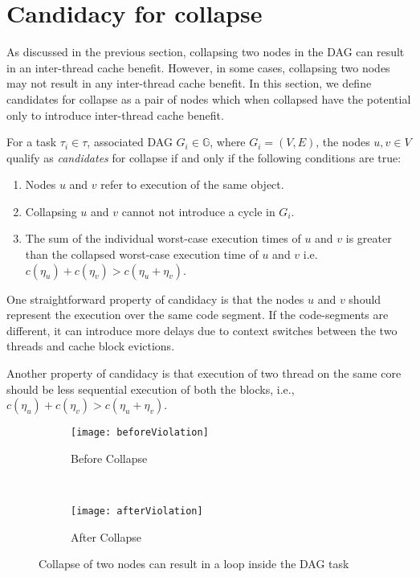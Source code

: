 \section{Candidacy for collapse}
As discussed in the previous section, collapsing two nodes in the DAG can result in an inter-thread cache benefit. However, in some cases, collapsing two nodes may not result in any inter-thread cache benefit. In this section, we define candidates for collapse as a pair of nodes which when collapsed have the potential only to introduce inter-thread cache benefit. 

For a task ${\tau_i \in \tau}$, associated DAG ${G_i \in \mathbb{G}}$,
where ${G_i = (V, E)}$, the nodes ${u,v \in V}$ qualify as
\emph{candidates} for collapse if and only if the following conditions
are true: 
\begin{enumerate}
  \item Nodes ${u}$ and ${v}$ refer to execution of the same object.
  \item Collapsing ${u}$ and ${v}$ cannot not introduce a cycle in ${G_i}$.
  \item The sum of the individual worst-case execution times of ${u}$
    and ${v}$ is greater than the collapsed worst-case execution time
    of ${u}$ and ${v}$ i.e. ${c(\eta_u) + c(\eta_v) > c(\eta_u + \eta_v)}$.
\end{enumerate}

One straightforward property of candidacy is that the nodes $u$ and $v$ should represent the execution over the same code segment.  If the code-segments are different, it can introduce more delays due to context switches between the two threads and cache block evictions. 

Another property of candidacy is that execution of two thread on the same core should be less sequential execution of both the blocks, i.e., ${c(\eta_u) + c(\eta_v) > c(\eta_u + \eta_v)}$. 

\begin{figure}
  \centering
  \begin{subfigure}[b]{0.48\textwidth}{
      \texttt{[image: beforeViolation]}
      \caption{Before Collapse}
      \label{fig:beforeViolation}
    }
  \end{subfigure}~
  \begin{subfigure}[b]{0.33\textwidth}{
      \texttt{[image: afterViolation]}
      \caption{After Collapse}
      \label{fig:afterViolation}
    }
  \end{subfigure}
  \caption{Collapse of two nodes can result in a loop inside the DAG task}
  \label{fig:dag-violation}
\end{figure}


